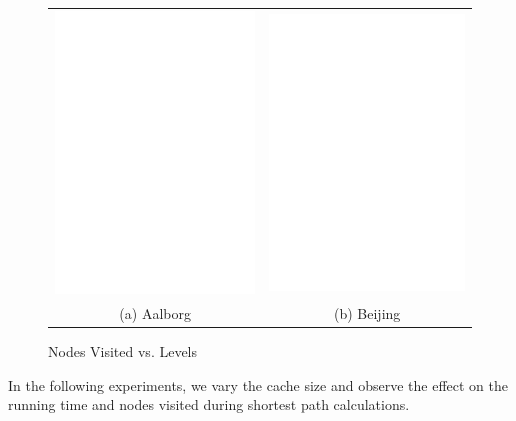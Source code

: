 \begin{figure}[htb]
\center
  \begin{tabular}{@{}c@{ }c@{}}
     \includegraphics[width=0.5\columnwidth]{figures/split_nodes_aal_server.pdf}
     &
     \includegraphics[width=0.5\columnwidth]{figures/split_nodes_bei_server.pdf}
      \\
     (a) Aalborg & (b)  Beijing
     \end{tabular}
\caption{Nodes Visited vs. Levels}
\label{fig:levelVsNodesvisited}
\end{figure}






%
In the following experiments, we vary the cache size and observe the effect on the running time and nodes visited during shortest path calculations.






